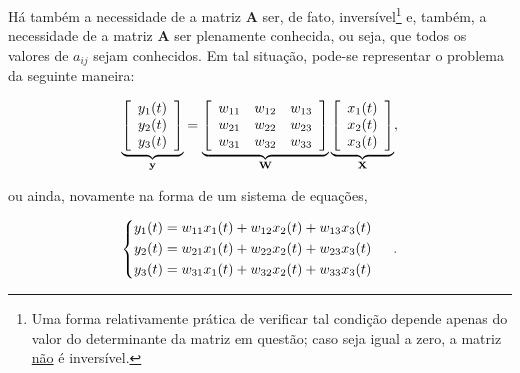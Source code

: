 Há também a necessidade de a matriz $\mathbf{A}$ ser, de fato, inversível\footnote{Uma forma relativamente prática de verificar tal condição depende apenas do valor do determinante da matriz em questão; caso seja igual a zero, a matriz \underline{não} é inversível.} e, também, a necessidade de a matriz $\mathbf{A}$ ser plenamente conhecida, ou seja, que todos os valores de $a_{ij}$ sejam conhecidos. Em tal situação, pode-se representar o problema da seguinte maneira:

\begin{equation}
    \underbrace{
    \left[\begin{array}{c}
        y_{1}(t) \\
        y_{2}(t) \\
        y_{3}(t)
    \end{array}\right]}_{\mathbf{y}}
    =
    \underbrace{
    \left[\begin{array}{ccc}
        w_{11} & w_{12} & w_{13} \\
        w_{21} & w_{22} & w_{23} \\
        w_{31} & w_{32} & w_{33}
    \end{array}\right]}_{\mathbf{W}}
    \underbrace{
    \left[\begin{array}{c}
        x_{1}(t) \\
        x_{2}(t) \\
        x_{3}(t)
    \end{array}\right]}_{\mathbf{X}},
    \vspace{0.2cm}
    \label{eq:bss_inv_weighted_sum_mat}
\end{equation}

\noindent ou ainda, novamente na forma de um sistema de equações,

\begin{equation}
\begin{cases}
\begin{aligned}
    y_{1}(t) = w_{11} x_{1}(t) +  w_{12} x_{2}(t) +  w_{13} x_{3}(t) \\
    y_{2}(t) = w_{21} x_{1}(t) +  w_{22} x_{2}(t) +  w_{23} x_{3}(t) \\
    y_{3}(t) = w_{31} x_{1}(t) +  w_{32} x_{2}(t) +  w_{33} x_{3}(t)
    \label{eq:bss_inv_weighted_sum}
\end{aligned}
\end{cases}
\hspace{0.1cm}.
\vspace{0.2cm}
\end{equation}

